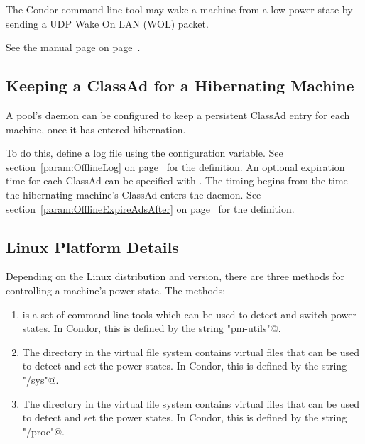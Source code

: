 The Condor command line tool  may wake a machine
from a low power state by 
sending a UDP Wake On LAN (WOL) packet. 

See the  manual page on
page~\pageref{man-condor-power}.

\subsection{Keeping a ClassAd for a Hibernating Machine}

A pool's  daemon can be configured to keep a 
persistent ClassAd entry for each machine, once it has entered hibernation.

To do this, define a log file using the 
configuration variable.
See section~\ref{param:OfflineLog} on
page~\pageref{param:OfflineLog} for the definition.
An optional expiration time for each ClassAd can
be specified with .
The timing begins from the time the hibernating machine's ClassAd enters
the  daemon.
See section~\ref{param:OfflineExpireAdsAfter} on
page~\pageref{param:OfflineExpireAdsAfter} for the definition.

\subsection{Linux Platform Details}

Depending on the Linux distribution and version,
there are three 
methods for controlling a machine's power state.
The methods:
\begin{enumerate}
\item {} is a set of command line tools which can be used to
  detect and switch power states.
  In Condor, this is defined by the string \verb@"pm-utils"@.
\item The directory in the virtual file system  
  contains virtual files that can be used to detect and set the power states.
  In Condor, this is defined by the string \verb@"/sys"@.
\item The directory in the virtual file system  
  contains virtual files that can be used to detect and set the power states.
  In Condor, this is defined by the string \verb@"/proc"@.
\end{enumerate}

